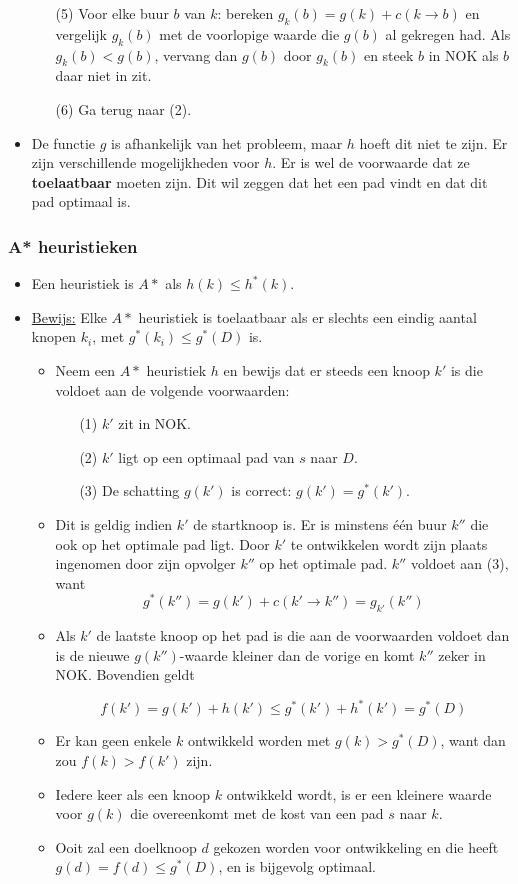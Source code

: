 \begin{itemize}
\begin{enumerate}
		\item[(5)] Voor elke buur $b$ van $k$: bereken $g_k(b) = g(k) + c(k \rightarrow b)$ en vergelijk $g_k(b)$ met de voorlopige waarde die $g(b)$ al gekregen had. Als $g_k(b) < g(b)$, vervang dan $g(b)$ door $g_k(b)$ en steek $b$ in NOK als $b$ daar niet in zit.
		\item[(6)] Ga terug naar (2).
	\end{enumerate}
	\item De functie $g$ is afhankelijk van het probleem, maar $h$ hoeft dit niet te zijn. Er zijn verschillende mogelijkheden voor $h$. Er is wel de voorwaarde dat ze \textbf{toelaatbaar} moeten zijn. Dit wil zeggen dat het een pad vindt en dat dit pad optimaal is.
\end{itemize}
\subsubsection{A* heuristieken}
\begin{itemize}
	\item Een heuristiek is $A*$ als $h(k) \leq h^*(k)$.
	\item \underline{Bewijs:} Elke $A*$ heuristiek is toelaatbaar als er slechts een eindig aantal knopen $k_i$, met $g^*(k_i) \leq g^*(D)$ is.
	\begin{itemize}
		\item Neem een $A*$ heuristiek $h$ en bewijs dat er steeds een knoop $k'$ is die voldoet aan de volgende voorwaarden:
		\begin{enumerate}
			\item[(1)] $k'$ zit in NOK.
			\item[(2)] $k'$ ligt op een optimaal pad van $s$ naar $D$.
			\item[(3)] De schatting $g(k')$ is correct: $g(k') = g^*(k')$.
		\end{enumerate}
	\item Dit is geldig indien $k'$ de startknoop is. Er is minstens één buur $k''$ die ook op het optimale pad ligt. Door $k'$ te ontwikkelen wordt zijn plaats ingenomen door zijn opvolger $k''$ op het optimale pad.  $k''$ voldoet aan (3), want
	$$g^*(k'') = g(k') + c(k' \rightarrow k'') = g_{k'}(k'')$$
	\item Als $k'$ de laatste knoop op het pad is die aan de voorwaarden voldoet dan is de nieuwe $g(k'')$-waarde kleiner dan de vorige en komt $k''$ zeker in NOK. Bovendien geldt
	
	$$f(k') = g(k') + h(k') \leq g^*(k') + h^*(k') = g^*(D)$$
	
	\item Er kan geen enkele $k$ ontwikkeld worden met $g(k) > g^*(D)$, want dan zou $f(k) > f(k')$ zijn.
	\item Iedere keer als een knoop $k$ ontwikkeld wordt, is er een kleinere waarde voor $g(k)$ die overeenkomt met de kost van een pad $s$ naar $k$.
	\item Ooit zal een doelknoop $d$ gekozen worden voor ontwikkeling en die heeft $g(d) = f(d) \leq g^*(D)$, en is bijgevolg optimaal.
	\end{itemize}
\end{itemize}

